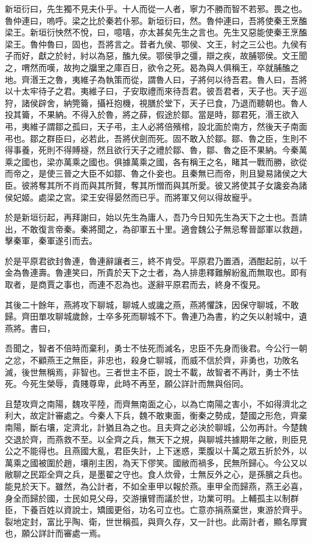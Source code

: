 新垣衍曰，先生獨不見夫仆乎。十人而從一人者，寧力不勝而智不若邪。畏之也。魯仲連曰，嗚呼。梁之比於秦若仆邪。新垣衍曰，然。魯仲連曰，吾將使秦王烹醢梁王。新垣衍怏然不悅，曰，噫嘻，亦太甚矣先生之言也。先生又惡能使秦王烹醢梁王。魯仲魯曰，固也，吾將言之。昔者九侯、鄂侯、文王，紂之三公也。九侯有子而好，獻之於紂，紂以為惡，醢九侯。鄂侯爭之彊，辯之疾，故脯鄂侯。文王聞之，喟然而嘆，故拘之牖里之庫百日，欲令之死。曷為與人俱稱王，卒就脯醢之地。齊湣王之魯，夷維子為執策而從，謂魯人曰，子將何以待吾君。魯人曰，吾將以十太牢待子之君。夷維子曰，子安取禮而來待吾君。彼吾君者，天子也。天子巡狩，諸侯辟舍，納筦籥，攝衽抱機，視膳於堂下，天子已食，乃退而聽朝也。魯人投其籥，不果納。不得入於魯，將之薛，假途於鄒。當是時，鄒君死，湣王欲入弔，夷維子謂鄒之孤曰，天子弔，主人必將倍殯棺，設北面於南方，然後天子南面弔也。鄒之群臣曰，必若此，吾將伏劍而死。固不敢入於鄒。鄒、魯之臣，生則不得事養，死則不得賻襚，然且欲行天子之禮於鄒、魯，鄒、魯之臣不果納。今秦萬乘之國也，梁亦萬乘之國也。俱據萬乘之國，各有稱王之名，睹其一戰而勝，欲從而帝之，是使三晉之大臣不如鄒、魯之仆妾也。且秦無已而帝，則且變易諸侯之大臣。彼將奪其所不肖而與其所賢，奪其所憎而與其所愛。彼又將使其子女讒妾為諸侯妃姬。處梁之宮。梁王安得晏然而已乎。而將軍又何以得故寵乎。

於是新垣衍起，再拜謝曰，始以先生為庸人，吾乃今日知先生為天下之士也。吾請出，不敢復言帝秦。秦將聞之，為卻軍五十里。適會魏公子無忌奪晉鄙軍以救趙，擊秦軍，秦軍遂引而去。

於是平原君欲封魯連，魯連辭讓者三，終不肯受。平原君乃置酒，酒酣起前，以千金為魯連壽。魯連笑曰，所貴於天下之士者，為人排患釋難解紛亂而無取也。即有取者，是商賈之事也，而連不忍為也。遂辭平原君而去，終身不復見。

其後二十餘年，燕將攻下聊城，聊城人或讒之燕，燕將懼誅，因保守聊城，不敢歸。齊田單攻聊城歲餘，士卒多死而聊城不下。魯連乃為書，約之矢以射城中，遺燕將。書曰，

吾聞之，智者不倍時而棄利，勇士不怯死而滅名，忠臣不先身而後君。今公行一朝之忿，不顧燕王之無臣，非忠也，殺身亡聊城，而威不信於齊，非勇也，功敗名滅，後世無稱焉，非智也。三者世主不臣，說士不載，故智者不再計，勇士不怯死。今死生榮辱，貴賤尊卑，此時不再至，願公詳計而無與俗同。

且楚攻齊之南陽，魏攻平陸，而齊無南面之心，以為亡南陽之害小，不如得濟北之利大，故定計審處之。今秦人下兵，魏不敢東面，衡秦之勢成，楚國之形危，齊棄南陽，斷右壤，定濟北，計猶且為之也。且夫齊之必決於聊城，公勿再計。今楚魏交退於齊，而燕救不至。以全齊之兵，無天下之規，與聊城共據期年之敝，則臣見公之不能得也。且燕國大亂，君臣失計，上下迷惑，栗腹以十萬之眾五折於外，以萬乘之國被圍於趙，壤削主困，為天下僇笑。國敝而禍多，民無所歸心。今公又以敝聊之民距全齊之兵，是墨翟之守也。食人炊骨，士無反外之心，是孫臏之兵也。能見於天下。雖然，為公計者，不如全車甲以報於燕。車甲全而歸燕，燕王必喜，身全而歸於國，士民如見父母，交游攘臂而議於世，功業可明。上輔孤主以制群臣，下養百姓以資說士，矯國更俗，功名可立也。亡意亦捐燕棄世，東游於齊乎。裂地定封，富比乎陶、衛，世世稱孤，與齊久存，又一計也。此兩計者，顯名厚實也，願公詳計而審處一焉。

